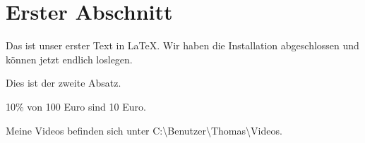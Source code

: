 \documentclass[a4paper,12pt]{scrartcl}
\begin{document}
%
\section{Erster Abschnitt}
Das ist unser erster Text in \LaTeX{}. Wir haben die Installation abgeschlossen
und können jetzt endlich loslegen.

Dies ist der zweite Absatz.

10\% von 100 Euro sind 10 Euro.

Meine Videos befinden sich unter
C:\textbackslash Benutzer\textbackslash Thomas\textbackslash Videos.
\end{document}
